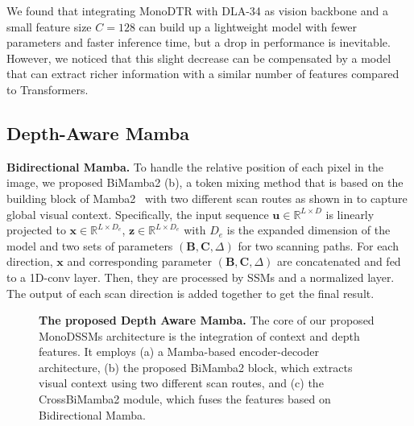 We found that integrating MonoDTR \cite{MonoDTR} with DLA-34 \cite{DLA} as vision backbone and a small feature size $C = 128$ can build up a lightweight model with fewer parameters and faster inference time, but a drop in performance is inevitable. However, we noticed that this slight decrease can be compensated by a model that can extract richer information with a similar number of features compared to Transformers.

\subsection{Depth-Aware Mamba} \label{sec:5.2.3}


\textbf{Bidirectional Mamba.} To handle the relative position of each pixel in the image, we proposed BiMamba2 (b), a token mixing method that is based on the building block of Mamba2~\cite{mamba2} with two different scan routes as shown in  to capture global visual context. Specifically, the input sequence $\mathbf{u}\in \mathbb{R}^{L\times D}$ is linearly projected to $\mathbf{x}\in 
\mathbb{R}^{L\times D_e}$, $\mathbf{z} \in \mathbb{R}^{L\times D_e}$ with $D_e$ is the expanded dimension of the model and two sets of parameters $\left(\mathbf{B},\mathbf{C},\Delta\right)$ for two scanning paths. 
For each direction, $\mathbf{x}$ and corresponding parameter $\left(\mathbf{B},\mathbf{C},\Delta\right)$ are concatenated and fed to a 1D-conv layer. Then, they are processed by SSMs and a normalized layer. The output of each scan direction is added together to get the final result.

\begin{figure}[h!]
    \centering
    
    \caption{\textbf{The proposed Depth Aware Mamba.} 
    The core of our proposed MonoDSSMs architecture is the integration of context and depth features. It employs (a) a Mamba-based encoder-decoder architecture,  (b) the proposed BiMamba2 block, which extracts visual context using two different scan routes, and (c) the CrossBiMamba2 module, which fuses the features based on Bidirectional Mamba.
    }
    \label{fig:DepthAwareMamba}
\end{figure}

